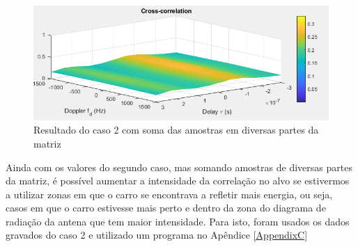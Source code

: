 \begin{figure}[h]
\centering
\includegraphics[scale=0.5]{chapters/ch5/assets/15mmsum}
\caption[Caso 2 especial]{Resultado do caso 2 com soma das amostras em diversas partes da matriz}
\label{fig:15mmsum}
\end{figure}

Ainda com os valores do segundo caso, mas somando amostras de diversas partes da matriz, é possível aumentar a intensidade da correlação no alvo se estivermos a utilizar zonas em que o carro se encontrava a refletir mais energia, ou seja, casos em que o carro estivesse mais perto e dentro da zona do diagrama de radiação da antena que tem maior intensidade. Para isto, foram usados os dados gravados do caso 2 e utilizado um programa no Apêndice \ref{AppendixC}